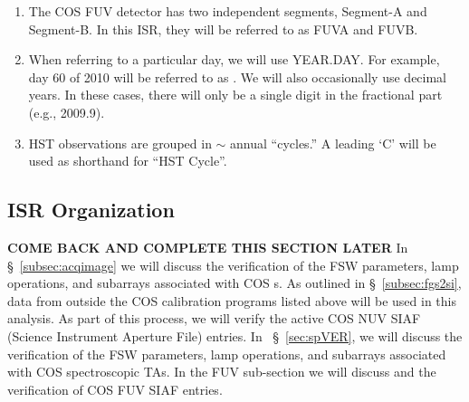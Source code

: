 \begin{enumerate}
	\item{The COS FUV detector has two independent segments, Segment-A and Segment-B. In this ISR, they will be referred to as FUVA and FUVB.}
	\item{When referring to a particular day, we will use YEAR.DAY. For example, day 60 of 2010 will be referred to as \psiafdate. We will also occasionally use decimal years. In these cases, there will only be a single digit in the fractional part (e.g., 2009.9).}
	\item{HST observations are grouped in $\sim$ annual ``cycles.'' A leading `C' will be used as shorthand for ``HST Cycle''.}
\end{enumerate}

\subsection{ISR Organization}\label{subsec:org}
{\bf COME BACK AND COMPLETE THIS SECTION LATER}
In \S~\ref{subsec:acqimage} we will discuss the verification of the FSW parameters, lamp operations, and subarrays associated with COS s.
As outlined in \S~\ref{subsec:fgs2si}, data from outside the COS calibration programs listed above will be used in this analysis.
As part of this process, we will verify the active COS NUV SIAF (Science Instrument Aperture File) entries. In ~\S~\ref{sec:spVER},
we will discuss the verification of the FSW parameters, lamp operations, and subarrays associated with COS spectroscopic TAs.
In the FUV sub-section we will discuss and the verification of COS FUV SIAF entries.
